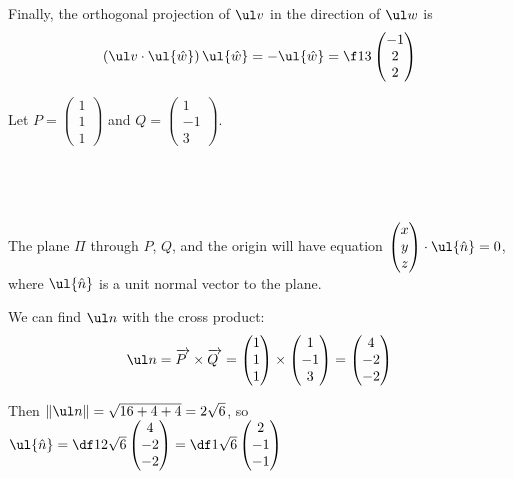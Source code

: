 \documentclass[a4paper]{article}
\begin{document}
Finally, the orthogonal projection of $\ul v$ in the direction of $\ul w$ is $$(\ul v \cdot \ul{\hat w})\, \ul{\hat w} = - \ul{\hat w} = \f13 \begin{pmatrix}-1\\ 2\\ 2\end{pmatrix}$$


Let $P = \begin{pmatrix}1\\ 1\\ 1\end{pmatrix}$ and $Q = \begin{pmatrix}1\\ -1\\ 3\end{pmatrix}$.

\subsection{~}

The plane $\Pi$ through $P$, $Q$, and the origin will have equation $\begin{pmatrix}x\\ y\\ z\end{pmatrix} \cdot \ul{\hat n} = 0$, where $\ul{\hat n}$ is a unit normal vector to the plane.

We can find $\ul n$ with the cross product: $$\ul n = \overrightarrow{P\;} \times \overrightarrow{Q\;} = \begin{pmatrix}1\\ 1\\ 1\end{pmatrix} \times \begin{pmatrix}1\\ -1\\ 3\end{pmatrix} = \begin{pmatrix}4\\ -2\\ -2\end{pmatrix}$$

Then $\|\ul n\| = \sqrt{16+4+4} = 2\sqrt6$, so $\ul{\hat n} = \df1{2\sqrt6} \begin{pmatrix}4\\ -2\\ -2\end{pmatrix} = \df1{\sqrt6} \begin{pmatrix}2\\ -1\\ -1\end{pmatrix}$
\end{document}
